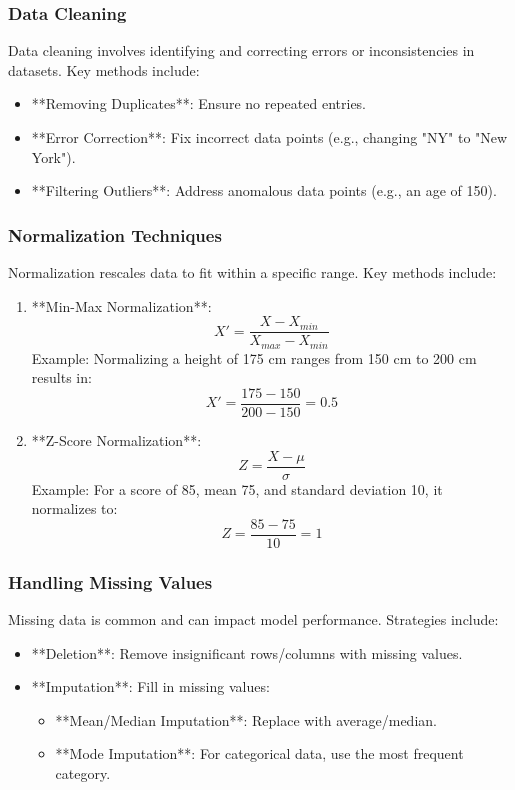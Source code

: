 \documentclass[aspectratio=169]{beamer}
\begin{document}
\begin{frame}[fragile]
    \frametitle{Data Cleaning}
    Data cleaning involves identifying and correcting errors or inconsistencies in datasets. Key methods include:
    \begin{itemize}
        \item **Removing Duplicates**: Ensure no repeated entries.
        \item **Error Correction**: Fix incorrect data points (e.g., changing "NY" to "New York").
        \item **Filtering Outliers**: Address anomalous data points (e.g., an age of 150).
    \end{itemize}
\end{frame}

\begin{frame}[fragile]
    \frametitle{Normalization Techniques}
    Normalization rescales data to fit within a specific range. Key methods include:
    \begin{enumerate}
        \item **Min-Max Normalization**:
            \begin{equation}
            X' = \frac{X - X_{min}}{X_{max} - X_{min}}
            \end{equation}
            Example: Normalizing a height of 175 cm ranges from 150 cm to 200 cm results in:
            \begin{equation}
            X' = \frac{175 - 150}{200 - 150} = 0.5
            \end{equation}
        \item **Z-Score Normalization**:
            \begin{equation}
            Z = \frac{X - \mu}{\sigma}
            \end{equation}
            Example: For a score of 85, mean 75, and standard deviation 10, it normalizes to:
            \begin{equation}
            Z = \frac{85 - 75}{10} = 1
            \end{equation}
    \end{enumerate}
\end{frame}

\begin{frame}[fragile]
    \frametitle{Handling Missing Values}
    Missing data is common and can impact model performance. Strategies include:
    \begin{itemize}
        \item **Deletion**: Remove insignificant rows/columns with missing values.
        \item **Imputation**: Fill in missing values:
            \begin{itemize}
                \item **Mean/Median Imputation**: Replace with average/median.
                \item **Mode Imputation**: For categorical data, use the most frequent category.
            \end{itemize}
    \end{itemize}
\end{frame}
\end{document}
